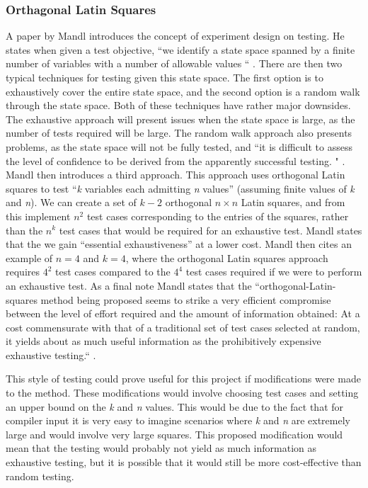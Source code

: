 \subsubsection{Orthagonal Latin Squares \label{orthsec}}
A paper by Mandl \cite{Mandl} introduces the concept of experiment design on testing. He states when given a test objective, ``we identify a state space spanned by a finite number of variables with a number of allowable values `` \cite{Mandl}. There are then two typical techniques for testing given this state space. The first option is to exhaustively cover the entire state space, and the second option is a random walk through the state space. Both of these techniques have rather major downsides. The exhaustive approach will present issues when the state space is large, as the number of tests required will be large. The random walk approach also presents problems, as the state space will not be fully tested, and ``it is difficult to assess the level of confidence to be derived from the apparently successful testing. " \cite{Mandl}. Mandl then introduces a third approach. This approach uses orthogonal Latin squares \cite{Parker} to test ``\textit{k} variables each admitting \textit{n} values'' \cite{Mandl} (assuming finite values of \textit{k} and \textit{n}). We can create a set of $k - 2$ orthogonal $n \times n$ Latin squares, and from this implement $n^2$ test cases corresponding to the entries of the squares, rather than the $n^k$ test cases that would be required for an exhaustive test. Mandl states that the we gain ``essential exhaustiveness'' at a lower cost. Mandl then cites an example of $n = 4$ and $k = 4$, where the orthogonal Latin squares approach requires $4^2$ test cases compared to the $4^4$ test cases required if we were to perform an exhaustive test. As a final note Mandl states that the  ``orthogonal-Latin-squares method being proposed seems to strike a very efficient compromise between the level of effort required and the amount of information obtained:  At a cost commensurate with that of a traditional set of test cases selected at random, it yields about as much useful information as the prohibitively expensive exhaustive testing.`` \cite{Mandl}. 

This style of testing could prove useful for this project if modifications were made to the method. These modifications would involve choosing test cases and setting an upper bound on the \textit{k} and \textit{n} values. This would be due to the fact that for compiler input it is very easy to imagine scenarios where \textit{k} and \textit{n} are extremely large and would involve very large squares. This proposed modification would mean that the testing would probably not yield as much information as exhaustive testing, but it is possible that it would still be more cost-effective than random testing.




